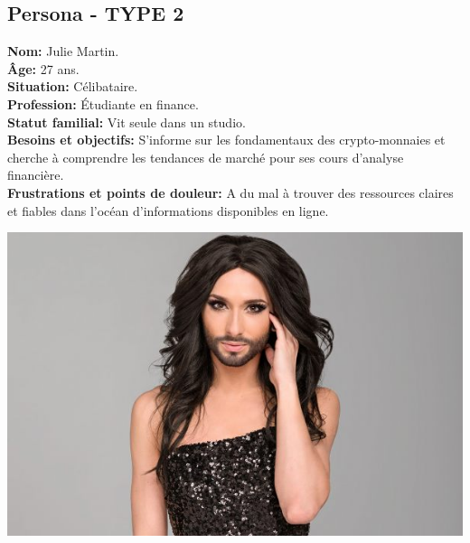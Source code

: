 \documentclass[a4paper,11pt]{article}
\begin{document}
\subsection{Persona - TYPE 2}
\begin{minipage}{0.6\textwidth} %
    \textbf{Nom:} Julie Martin.\\
    \textbf{Âge:} 27 ans.\\
    \textbf{Situation:} Célibataire.\\
    \textbf{Profession:} Étudiante en finance.\\
    \textbf{Statut familial:} Vit seule dans un studio.\\
    \textbf{Besoins et objectifs:} S’informe sur les fondamentaux des crypto-monnaies et cherche à comprendre les tendances de marché pour ses cours d’analyse financière.\\
    \textbf{Frustrations et points de douleur:} A du mal à trouver des ressources claires et fiables dans l’océan d’informations disponibles en ligne.\\
\end{minipage}%
\hspace{1cm}
\begin{minipage}{0.3\textwidth} %
    \begin{center}
        \includegraphics[width=\textwidth]{images/femmeabarbe.jpg} %
    \end{center}
\end{minipage}
\end{document}
